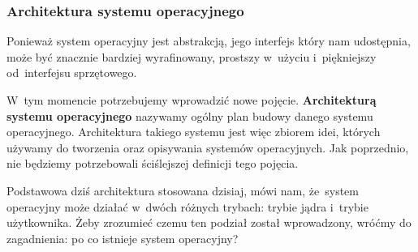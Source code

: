 \documentclass[10pt,t]{beamer}
\begin{document}
\begin{frame}
  \frametitle{Architektura systemu operacyjnego}


  Ponieważ system operacyjny jest abstrakcją, jego interfejs który
  nam udostępnia, może być znacznie bardziej wyrafinowany, prostszy
  w~użyciu i~piękniejszy od~interfejsu sprzętowego.

  W~tym momencie potrzebujemy wprowadzić nowe pojęcie.
  \textbf{Architekturą systemu operacyjnego} nazywamy ogólny plan budowy
  danego systemu operacyjnego. Architektura takiego systemu jest więc
  zbiorem idei, których używamy do tworzenia oraz opisywania systemów
  operacyjnych. Jak poprzednio, nie będziemy potrzebowali ściślejszej
  definicji tego pojęcia.

  Podstawowa dziś architektura stosowana dzisiaj, mówi nam, że~system
  operacyjny może działać w~dwóch różnych trybach: trybie jądra i~trybie
  użytkownika. Żeby zrozumieć czemu ten podział został wprowadzony,
  wróćmy do zagadnienia: po co istnieje system operacyjny?



\end{frame}
\end{document}
